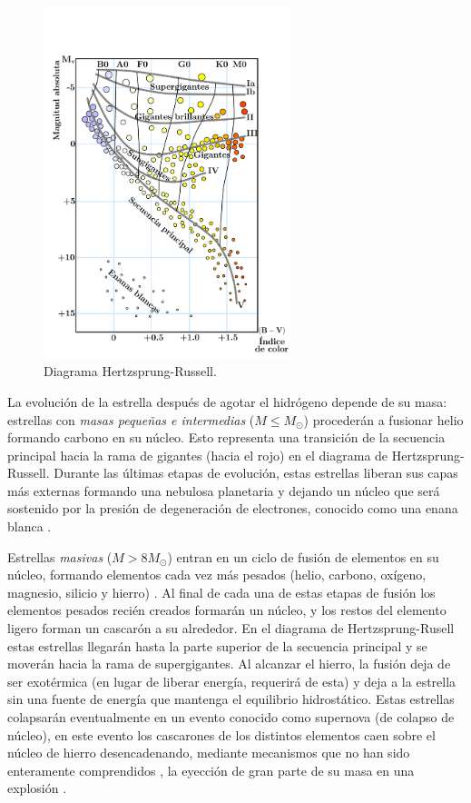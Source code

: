 \setcounter{footnote}{0}
\begin{figure}[H]
    \centering
    \includegraphics[width=205pt]{figures/H-R_diagram.pdf}%
    \caption[Diagrama Hertzsprung-Russell]{Diagrama Hertzsprung-Russell.\protect\footnotemark}
    \label{HR}
\end{figure}

La evolución de la estrella después de agotar el hidrógeno depende de su masa: estrellas con \emph{masas pequeñas e intermedias} ($M\leq M_{\odot}$) procederán a fusionar helio formando carbono en su núcleo. Esto representa una transición de la secuencia principal hacia la rama de gigantes (hacia el rojo) en el diagrama de Hertzsprung-Russell. Durante las últimas etapas de evolución, estas estrellas liberan sus capas más externas formando una nebulosa planetaria y dejando un núcleo que será sostenido por la presión de degeneración de electrones, conocido como una enana blanca \cite{Padmanabhan2000}.




Estrellas \emph{masivas} ($M>8 M_{\odot}$) entran en un ciclo de fusión de elementos en su núcleo, formando elementos cada vez más pesados (helio, carbono, oxígeno, magnesio, silicio y hierro) \cite{Glendenning2000}. Al final de cada una de estas etapas de fusión los elementos pesados recién creados formarán un núcleo, y los restos del elemento ligero forman un cascarón a su alrededor. En el diagrama de Hertzsprung-Rusell estas estrellas llegarán hasta la parte superior de la secuencia principal y se moverán hacia la rama de supergigantes. Al alcanzar el hierro, la fusión deja de ser exotérmica (en lugar de liberar energía, requerirá de esta) y deja a la estrella sin una fuente de energía que mantenga el equilibrio hidrostático. Estas estrellas colapsarán eventualmente en un evento conocido como supernova (de colapso de núcleo), en este evento los cascarones de los distintos elementos caen sobre el núcleo de hierro desencadenando, mediante mecanismos que no han sido enteramente comprendidos \cite{Janka2012}, la eyección de gran parte de su masa en una explosión \cite{Woosley2005}.

